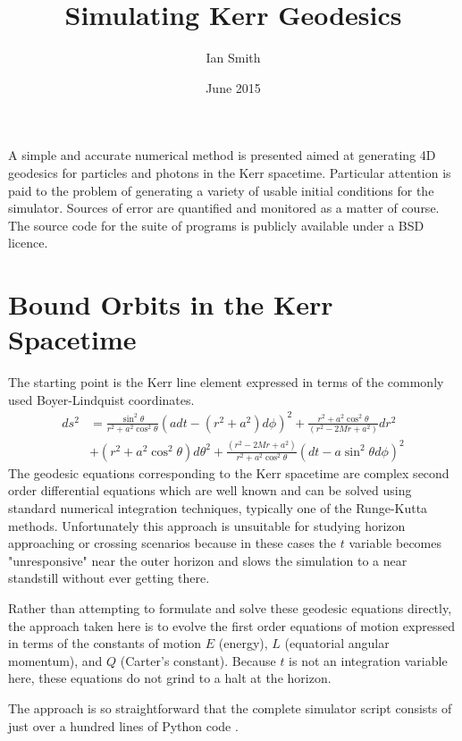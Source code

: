 \documentclass[11pt]{article}
\title{\textbf{Simulating Kerr Geodesics}}
\author{Ian Smith}
\date{June 2015}
\begin{document}
\maketitle

\abstract
A simple and accurate numerical method is presented aimed at generating 4D geodesics for particles and photons in the Kerr spacetime.  Particular attention is paid to the problem of generating a variety of usable initial conditions for the simulator.  Sources of error are quantified and monitored as a matter of course.  The source code for the suite of programs is publicly available under a BSD licence.

\section{Bound Orbits in the Kerr Spacetime}

The starting point is the Kerr line element expressed in terms of the commonly used Boyer-Lindquist coordinates.
\begin{equation}
\begin{aligned}
d s^2 &= \frac{ \sin^2 \theta } {r^2 + a^2 \cos^2 \theta} (a dt - (r^2 + a^2)d \phi )^2 + \frac{ r^2 + a^2 \cos^2 \theta } {(r^2 - 2Mr  + a^2)} d r^2 \\
&+ (r^2 + a^2 \cos^2 \theta) d \theta^2 + \frac{ (r^2 - 2Mr  + a^2) } {r^2 + a^2 \cos^2 \theta} (dt - a \sin^2 \theta d \phi )^2
\end{aligned}
\end{equation}
The geodesic equations corresponding to the Kerr spacetime are complex second order differential equations which are well known and can be solved using standard numerical integration techniques, typically one of the Runge-Kutta methods.  Unfortunately this approach is unsuitable for studying horizon approaching or crossing scenarios because in these cases the $t$ variable becomes "unresponsive" near the outer horizon and slows the simulation to a near standstill without ever getting there.

Rather than attempting to formulate and solve these geodesic equations directly, the approach taken here is to evolve the first order equations of motion expressed in terms of the constants of motion $E$ (energy), $L$ (equatorial angular momentum), and $Q$ (Carter's constant).  Because $t$ is not an integration variable here, these equations do not grind to a halt at the horizon.

The approach is so straightforward that the complete simulator script consists of just over a hundred lines of Python code \cite{m4r35n357}.
\end{document}
